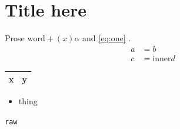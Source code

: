 \documentclass{article}
\begin{document}
\section{Title here}
Prose $\text{word} + \left( x \right) \alpha$ and \ref{eq:one} \cite{key}.
\begin{align}
  a &= b \label{eq:one} \\
  c &= \text{inner} d
\end{align}
\begin{tabular}{ll}
  \toprule
  x & y \\
  \bottomrule
\end{tabular}
\begin{itemize}
  \item[label] thing
\end{itemize}
\verb|raw|
\end{document}
